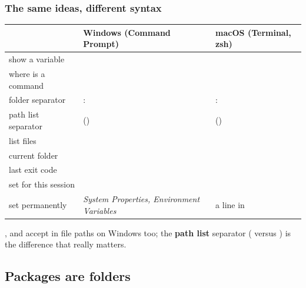 \documentclass[aspectratio=169,10pt,compress]{beamer}
\begin{document}
\begin{frame}[t,fragile] \frametitle{The same ideas, different syntax}
  \small
  \begin{tabular}{@{}L{0.26\textwidth}L{0.33\textwidth}L{0.33\textwidth}@{}}
    \toprule
                            & \textbf{Windows (Command Prompt)}       & \textbf{macOS (Terminal, zsh)} \\
    \midrule
    show a variable         &            &  \\
    where is a command      &                    &  \\
    folder separator        & \hCode{\textbackslash}:  & \hCode{/}:  \\
    path list separator     & \hCode{;} \quad () & \hCode{:} \quad () \\
    list files              &                            &  \\
    current folder          &                             &  \\
    last exit code          &            &  \\
    set for this session    &                 &  \\
    set permanently         & \emph{System Properties, Environment Variables} & a line in  \\
    \bottomrule
  \end{tabular}

  \vspace{0.6em}
  ,  and  accept \hCode{/} in file paths on Windows too; the \textbf{path list} separator
  (\hCode{;} versus \hCode{:}) is the difference that really matters.
\end{frame}


\subsection[Packages]{Packages are folders}
\end{document}
